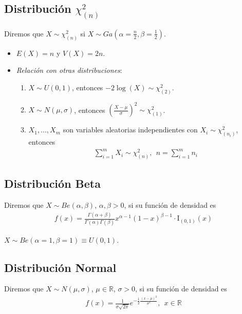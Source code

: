 \subsection{Distribución $\chi_{(n)}^2$}
Diremos que $X \sim \chi_{(n)}^2$ si $X \sim Ga\left( \alpha = \frac{n}{2}, \beta = \frac{1}{2}\right)$.
\begin{itemize}
    \item $E(X) = n$ y $V(X) = 2n$.
    \item \textit{Relación con otras distribuciones}:
    \begin{enumerate}
        \item $X \sim U(0,1)$, entonces $-2\log(X) \sim \chi_{(2)}^2$.
        \item $X \sim N(\mu,\sigma)$, entonces $\left( \frac{X - \mu}{\sigma}\right)^2 \sim \chi_{(1)}^2$.
        \item $X_1,...,X_m$ son variables aleatorias independientes con $X_i \sim \chi_{(n_i)}^2$, entonces
        \begin{align*}
            \sum_{i=1}^{m}{X_i} \sim \chi_{(n)}^2, \ \ n = \sum_{i=1}^{m}{n_i}
        \end{align*}
    \end{enumerate}
\end{itemize}

\subsection{Distribución Beta}
Diremos que $X \sim Be(\alpha, \beta)$, $\alpha,\beta >0$, si su función de densidad es
\begin{align*}
    f(x) = \frac{\Gamma(\alpha + \beta)}{\Gamma(\alpha)\Gamma(\beta)}x^{\alpha -1}(1-x)^{\beta -1} \cdot \text{I}_{(0,1)}(x)
\end{align*}
\begin{obs}
$X \sim Be(\alpha = 1, \beta = 1) \equiv U(0,1)$.
\end{obs}

\subsection{Distribución Normal}
Diremos que $X \sim N(\mu, \sigma)$, $\mu \in \mathbb{R}$, $\sigma >0$, si su función de densidad es
\begin{align*}
    f(x) = \frac{1}{\sigma\sqrt{2\pi}}e^{-\frac{1}{2} \frac{(x -\mu)^2}{\sigma^2}}, \ \ x \in \mathbb{R}
\end{align*}

